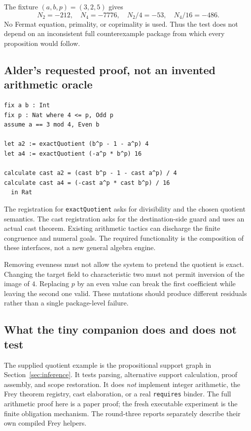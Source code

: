\documentclass[11pt,a4paper]{article}
\newcommand{\code}[1]{\nolinkurl{#1}}
\theoremstyle{plain}
\theoremstyle{definition}
\theoremstyle{remark}
\begin{document}
The fixture $(a,b,p)=(3,2,5)$ gives
\[
 N_2=-212,\quad N_4=-7776,\quad N_2/4=-53,\quad N_4/16=-486.
\]
No Fermat equation, primality, or coprimality is used. Thus the test does not depend on an inconsistent full counterexample package from which every proposition would follow.

\subsection{Alder's requested proof, not an invented arithmetic oracle}
\Needspace{184pt}
\begin{lstlisting}
fix a b : Int
fix p : Nat where 4 <= p, Odd p
assume a == 3 mod 4, Even b

let a2 := exactQuotient (b^p - 1 - a^p) 4
let a4 := exactQuotient (-a^p * b^p) 16

calculate cast a2 = (cast b^p - 1 - cast a^p) / 4
calculate cast a4 = (-cast a^p * cast b^p) / 16
  in Rat
\end{lstlisting}
The registration for \code{exactQuotient} asks for divisibility and the chosen quotient semantics. The cast registration asks for the destination-side guard and uses an actual cast theorem. Existing arithmetic tactics can discharge the finite congruence and numeral goals. The required functionality is the composition of these interfaces, not a new general algebra engine.

Removing evenness must not allow the system to pretend the quotient is exact. Changing the target field to characteristic two must not permit inversion of the image of $4$. Replacing $p$ by an even value can break the first coefficient while leaving the second one valid. These mutations should produce different residuals rather than a single package-level failure.

\subsection{What the tiny companion does and does not test}
The supplied quotient example is the propositional support graph in Section~\ref{sec:inference}. It tests parsing, alternative support calculation, proof assembly, and scope restoration. It does \emph{not} implement integer arithmetic, the Frey theorem registry, cast elaboration, or a real \code{requires} binder. The full arithmetic proof here is a paper proof; the fresh executable experiment is the finite obligation mechanism. The round-three reports separately describe their own compiled Frey helpers.
\end{document}
